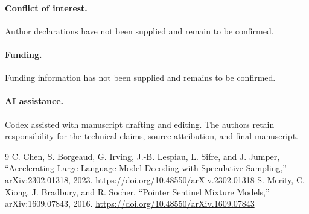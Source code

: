 \documentclass[10pt]{article}
\begin{document}
\paragraph{Conflict of interest.} Author declarations have not been supplied and remain to be confirmed.
\paragraph{Funding.} Funding information has not been supplied and remains to be confirmed.
\paragraph{AI assistance.} Codex assisted with manuscript drafting and editing. The authors retain responsibility for the technical claims, source attribution, and final manuscript.


\begin{thebibliography}{9}
 C. Chen, S. Borgeaud, G. Irving, J.-B. Lespiau, L. Sifre, and J. Jumper, ``Accelerating Large Language Model Decoding with Speculative Sampling,'' arXiv:2302.01318, 2023. \url{https://doi.org/10.48550/arXiv.2302.01318}
 S. Merity, C. Xiong, J. Bradbury, and R. Socher, ``Pointer Sentinel Mixture Models,'' arXiv:1609.07843, 2016. \url{https://doi.org/10.48550/arXiv.1609.07843}
\end{thebibliography}
\end{document}
